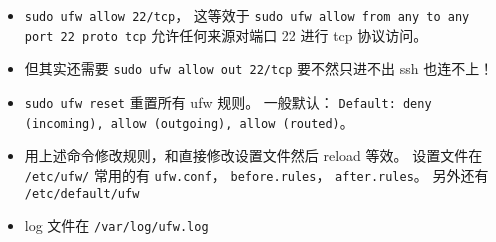 \begin{itemize}
\item \verb`sudo ufw allow 22/tcp`， 这等效于 \verb`sudo ufw allow from any to any port 22 proto tcp` 允许任何来源对端口 22 进行 tcp 协议访问。
\item 但其实还需要 \verb`sudo ufw allow out 22/tcp` 要不然只进不出 ssh 也连不上！
\item \verb`sudo ufw reset` 重置所有 ufw 规则。 一般默认： \verb`Default: deny (incoming), allow (outgoing), allow (routed)`。
\item 用上述命令修改规则，和直接修改设置文件然后 reload 等效。 设置文件在 \verb`/etc/ufw/` 常用的有 \verb`ufw.conf`， \verb`before.rules`， \verb`after.rules`。 另外还有 \verb`/etc/default/ufw`
\item log 文件在 \verb`/var/log/ufw.log`
\end{itemize}

